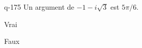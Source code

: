 \begin{truefalse}{q-175}
Un argument de $-1-i\sqrt{3}$ est $5\pi/6$.
\item Vrai
\item* Faux
\end{truefalse}


